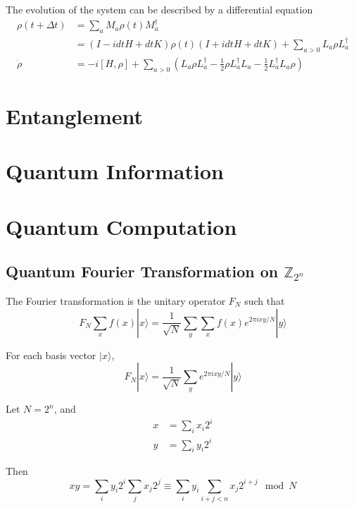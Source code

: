 \documentclass[12pt]{book}
\begin{document}
The evolution of the system can be described by a differential equation
\begin{align}
	\rho(t+\Delta t)&=\sum_a M_a\rho(t) M_a^\dagger\\
	&=(I-idtH+dtK)\rho(t)(I+idtH+dtK)+\sum_{a>0}L_a\rho L_a^\dagger\\
	\dot \rho&=-i[H,\rho]+\sum_{a>0}(L_a\rho L_a^\dagger-\frac 12\rho L_a^\dagger L_a-\frac 12L_a^\dagger L_a\rho )
\end{align}

\chapter{Entanglement}

\chapter{Quantum Information}

\chapter{Quantum Computation}

\section{Quantum Fourier Transformation on $\mathbb Z_{2^n}$}

The Fourier transformation is the unitary operator $F_N$ such that
\begin{equation}
	F_N\sum_x f(x)|x\rangle=\frac 1{\sqrt{N}}\sum_y\sum_x f(x)e^{2\pi ixy/N}|y\rangle
\end{equation}

For each basis vector $|x\rangle$,
\begin{equation}
	F_N|x\rangle=\frac 1{\sqrt{N}}\sum_y e^{2\pi ixy/N}|y\rangle
\end{equation}

Let $N=2^n$, and
\begin{align}
	x&=\sum_i x_i2^i\\
	y&=\sum_i y_i2^i
\end{align}

Then
\begin{equation}
	xy=\sum_i y_i2^i\sum_j x_j2^j\equiv \sum_i y_i\sum_{i+j<n} x_j2^{i+j} \mod N
\end{equation}
\end{document}

